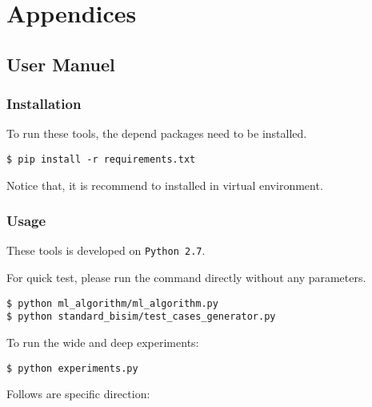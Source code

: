 \appendix
\section{Appendices}
\label{sec:appendics}

\subsection{User Manuel}
\subsubsection*{Installation}
To run these tools, the depend packages need to be installed.
\begin{verbatim}
$ pip install -r requirements.txt

\end{verbatim}
Notice that, it is recommend to installed in virtual environment.
\subsubsection*{Usage}

These tools is developed on \texttt{Python 2.7}.

For quick test, please run the command directly without any parameters.
\begin{verbatim}
$ python ml_algorithm/ml_algorithm.py
$ python standard_bisim/test_cases_generator.py
\end{verbatim}

To run the wide and deep experiments:
\begin{verbatim}
$ python experiments.py 
\end{verbatim}

Follows are specific direction:

